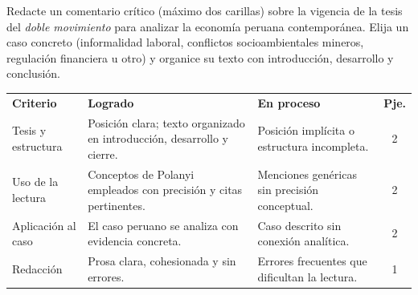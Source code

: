 \documentclass{academic-exam}
\begin{document}
\begin{pregunta}
Redacte un comentario crítico (máximo dos carillas) sobre la vigencia de
la tesis del \emph{doble movimiento} para analizar la economía peruana
contemporánea. Elija un caso concreto (informalidad laboral, conflictos
socioambientales mineros, regulación financiera u otro) y organice su
texto con introducción, desarrollo y conclusión.

\begin{criterios}
\small
\renewcommand{\arraystretch}{1.35}
\begin{tabularx}{\linewidth}{@{}p{2.9cm} X X c@{}}
  \textbf{Criterio} & \textbf{Logrado} & \textbf{En proceso} & \textbf{Pje.}\\
  \arrayrulecolor{grislinea}\hline\addlinespace[3pt]
  Tesis y estructura &
    Posición clara; texto organizado en intro\-ducción, desarrollo y cierre. &
    Posición implícita o estructura incompleta. & 2\\
  Uso de la lectura &
    Conceptos de Polanyi empleados con precisión y citas pertinentes. &
    Menciones genéricas sin precisión conceptual. & 2\\
  Aplicación al caso &
    El caso peruano se analiza con evidencia concreta. &
    Caso descrito sin conexión analítica. & 2\\
  Redacción &
    Prosa clara, cohesionada y sin errores. &
    Errores frecuentes que dificultan la lectura. & 1\\
\end{tabularx}
\end{criterios}
\end{pregunta}

\findelexamen
\end{document}
